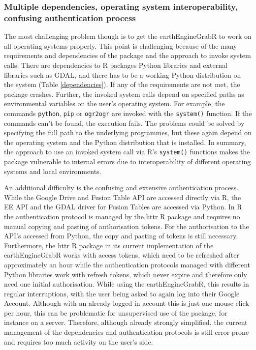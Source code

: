 \subsubsection{Multiple dependencies, operating system interoperability, confusing authentication process}

The most challenging problem though is to get the earthEngineGrabR to work on all operating systems properly. This point is challenging because of the many requirements and dependencies of the package and the approach to invoke system calls. There are dependencies to R packages Python libraries and external libraries such as GDAL, and there has to be a working Python distribution on the system (Table \ref{dependencies}). If any of the requirements are not met, the package crashes. 
Further, the invoked system calls depend on specified paths as environmental variables on the user's operating system. For example, the commands \texttt{python}, \texttt{pip} or \texttt{ogr2ogr} are invoked with the \texttt{system()} function. If the commands can't be found, the execution fails. The problems could be solved by specifying the full path to the underlying programmes, but these again depend on the operating system and the Python distribution that is installed. In summary, the approach to use an invoked system call via R's \texttt{system()} functions makes the package vulnerable to internal errors due to interoperability of different operating systems and local environments.

An additional difficulty is the confusing and extensive authentication process. While the Google Drive and Fusion Table API are accessed directly via R, the EE API and the GDAL driver for Fusion Tables are accessed via Python. In R the authentication protocol is managed by the httr R package and requires no manual copying and pasting of authorisation tokens. For the authorisation to the API's accessed from Python, the copy and pasting of tokens is still necessary. 
Furthermore, the httr R package in its current implementation of the earthEngineGrabR works with access tokens, which need to be refreshed after approximately an hour while the authentication protocols managed with different Python libraries work with refresh tokens, which never expire and therefore only need one initial authorisation. While using the earthEngineGrabR, this results in regular interruptions, with the user being asked to again log into their Google Account. Although with an already logged in account this is just one mouse click per hour, this can be problematic for unsupervised use of the package, for instance on a  server. Therefore, although already strongly simplified, the current management of the dependencies and authentication protocols is still error-prone and requires too much activity on the user's side.

